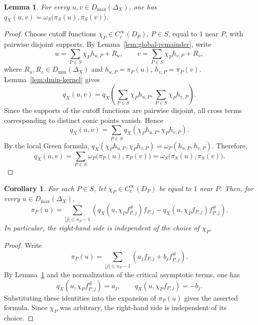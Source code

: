 \documentclass[12pt]{amsart}
\theoremstyle{plain}
\newtheorem{lem}[thm]{Lemma}
\newtheorem{cor}[thm]{Corollary}
\theoremstyle{definition}
\theoremstyle{remark}
\numberwithin{equation}{section} \numberwithin{figure}{section}
\begin{document}
\begin{lem}\label{lem:green-form-global}
For every \(u,v\in D_{\max}(\Delta_X)\), one has
\(q_X(u,v)=\omega_S\bigl(\pi_S(u),\pi_S(v)\bigr)\).
\end{lem}
\begin{proof}
Choose cutoff functions
\(\chi_P\in C_c^\infty(D_P)\), \(P\in S\), equal to \(1\) near \(P\),
with pairwise disjoint supports. By
Lemma~\ref{lem:global-remainder}, write
\[
u=\sum_{P\in S}\chi_P h_{u,P}+R_u,
\qquad
v=\sum_{P\in S}\chi_P h_{v,P}+R_v,
\]
where \(R_u,R_v\in D_{\min}(\Delta_X)\) and
\(h_{u,P}=\pi_P(u)\), \(h_{v,P}=\pi_P(v)\).
Lemma~\ref{lem:dmin-kernel} gives
\[
q_X(u,v)
=
q_X\left(
\sum_{P\in S}\chi_P h_{u,P},
\sum_{P\in S}\chi_P h_{v,P}
\right).
\]
Since the supports of the cutoff functions are pairwise disjoint, all
cross terms corresponding to distinct conic points vanish. Hence
\[
q_X(u,v)
=
\sum_{P\in S}
q_X(\chi_P h_{u,P},\chi_P h_{v,P}).
\]
By the local Green formula,
\(q_X(\chi_P h_{u,P},\chi_P h_{v,P})
=\omega_P(h_{u,P},h_{v,P})\).
Therefore,
\[
q_X(u,v)
=
\sum_{P\in S}\omega_P\bigl(\pi_P(u),\pi_P(v)\bigr)
=
\omega_S\bigl(\pi_S(u),\pi_S(v)\bigr).
\]
\end{proof}



\begin{cor}\label{cor:critical-asymptotic-projection}
For each \(P\in S\), let
\(\chi_P\in C_c^\infty(D_P)\) be equal to \(1\) near \(P\). Then, for
every \(u\in D_{\max}(\Delta_X)\),
\[
\pi_P(u)
=
\sum_{|j|\leq n_P-1}
\left(
q_X(u,\chi_Pf_{P,j}^{\#})f_{P,j}
-
q_X(u,\chi_Pf_{P,j})f_{P,j}^{\#}
\right).
\]
In particular, the right-hand side is independent of the choice of
\(\chi_P\).
\end{cor}

\begin{proof}
Write
\[
\pi_P(u)
=
\sum_{|j|\leq n_P-1}
\left(
a_jf_{P,j}+b_jf_{P,j}^{\#}
\right).
\]
By Lemma~\ref{lem:green-form-global} and the normalization of the
critical asymptotic terms, one has
\[
q_X(u,\chi_Pf_{P,j}^{\#})=a_j,
\qquad
q_X(u,\chi_Pf_{P,j})=-b_j.
\]
Substituting these identities into the expansion of \(\pi_P(u)\)
gives the asserted formula. Since \(\chi_P\) was arbitrary, the
right-hand side is independent of its choice.
\end{proof}
\end{document}
